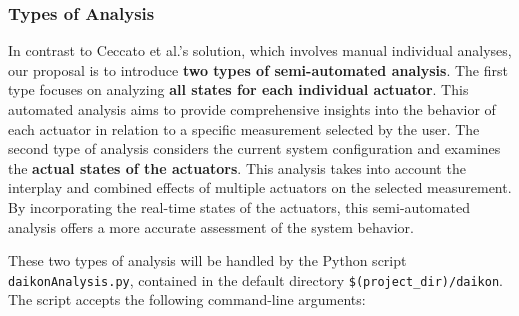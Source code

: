 \subsubsection{Types of Analysis}
\label{subsub:4_types_analysis}

In contrast to Ceccato et al.'s solution, which involves manual individual analyses, our proposal is to introduce \textbf{two types of semi-automated analysis}.\newline 
The first type focuses on analyzing \textbf{all states for each individual actuator}. This automated analysis aims to provide comprehensive insights into the behavior of each actuator in relation to a specific measurement selected by the user.\newline
The second type of analysis considers the current system configuration and examines the \textbf{actual states of the actuators}. This analysis takes into account the interplay and combined effects of multiple actuators on the selected measurement. By incorporating the real-time states of the actuators, this semi-automated analysis offers a more accurate assessment of the system behavior.

\bigskip
These two types of analysis will be handled by the Python script\\ \texttt{daikonAnalysis.py}, contained in the default directory \texttt{\$(project\_dir)/daikon}.\newline
The script accepts the following command-line arguments:

